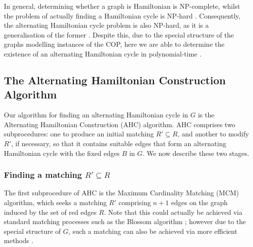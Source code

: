 \documentclass[a4paper,11pt,authoryear]{elsarticle}
\begin{document}
In general, determining whether a graph is Hamiltonian is NP-complete, whilst the problem of actually finding a Hamiltonian cycle is NP-hard \citep{karp1972}. Consequently, the alternating Hamiltonian cycle problem is also NP-hard, as it is a generalisation of the former \citep{haggkvist1977}. Despite this, due to the special structure of the graphs modelling instances of the COP, here we are able to determine the existence of an alternating Hamiltonian cycle in polynomial-time \citep{hawa2018}. 

\subsection{The Alternating Hamiltonian Construction Algorithm}
\label{sub:ahc}

\noindent Our algorithm for finding an alternating Hamiltonian cycle in $G$ is the Alternating Hamiltonian Construction (AHC) algorithm. AHC comprises two subprocedures: one to produce an initial matching $R' \subseteq R$, and another to modify $R'$, if necessary, so that it contains suitable edges that form an alternating Hamiltonian cycle with the fixed edges $B$ in $G$. We now describe these two stages.

\subsubsection{Finding a matching $R' \subseteq R$}
\label{subsub:mcm}

\noindent The first subprocedure of AHC is the Maximum Cardinality Matching (MCM) algorithm, which seeks a matching $R'$ comprising $n+1$ edges on the graph induced by the set of red edges $R$. Note that this could actually be achieved via standard matching processes such as the Blossom algorithm \citep{edmonds1965}; however due to the special structure of $G$, such a matching can also be achieved via more efficient methods \citep{mahadev1994, becker2015}.
\end{document}
